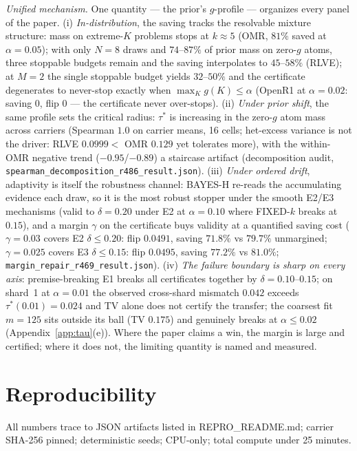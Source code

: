 \documentclass{article}
\theoremstyle{definition}
\theoremstyle{remark}
\begin{document}
\emph{Unified mechanism.} One quantity --- the prior's $g$-profile ---
organizes every panel of the paper. (i) \emph{In-distribution}, the
saving tracks the resolvable mixture structure: mass on extreme-$K$
problems stops at $k\approx5$ (OMR, $81\%$ saved at $\alpha{=}0.05$);
with only $N{=}8$ draws and $74$--$87\%$ of prior mass on zero-$g$
atoms, three stoppable budgets remain and the saving interpolates to
$45$--$58\%$ (RLVE); at $M{=}2$ the single stoppable budget yields
$32$--$50\%$ and the certificate degenerates to never-stop exactly when
$\max_K g(K)\le\alpha$ (OpenR1 at $\alpha{=}0.02$: saving $0$, flip $0$
--- the certificate never over-stops). (ii) \emph{Under prior shift},
the same profile sets the critical radius: $\tau^*$ is increasing in the
zero-$g$ atom mass across carriers (Spearman $1.0$ on carrier means, 16
cells; het-excess variance is not the driver: RLVE $0.0999<$ OMR $0.129$
yet tolerates more), with the within-OMR negative trend
($-0.95$/$-0.89$) a staircase artifact (decomposition audit,
\texttt{spearman\_decomposition\_r486\_result.json}). (iii) \emph{Under
ordered drift}, adaptivity is itself the robustness channel: BAYES-H
re-reads the accumulating evidence each draw, so it is the most robust
stopper under the smooth E2/E3 mechanisms (valid to $\delta{=}0.20$
under E2 at $\alpha{=}0.10$ where FIXED-$k$ breaks at $0.15$), and a
margin $\gamma$ on the certificate buys validity at a quantified saving
cost ($\gamma{=}0.03$ covers E2 $\delta\le0.20$: flip $0.0491$, saving
$71.8\%$ vs $79.7\%$ unmargined; $\gamma{=}0.025$ covers E3
$\delta\le0.15$: flip $0.0495$, saving $77.2\%$ vs $81.0\%$;
\texttt{margin\_repair\_r469\_result.json}). (iv) \emph{The failure
boundary is sharp on every axis}: premise-breaking E1 breaks all
certificates together by $\delta{=}0.10$--$0.15$; on shard~1 at
$\alpha{=}0.01$ the observed cross-shard mismatch $0.042$ exceeds
$\tau^*(0.01){=}0.024$ and TV alone does not certify the transfer; the
coarsest fit $m{=}125$ sits outside its ball (TV $0.175$) and genuinely
breaks at $\alpha\le0.02$ (Appendix~\ref{app:tau}(e)). Where the paper
claims a win, the margin is large and certified; where it does not, the
limiting quantity is named and measured.

\section{Reproducibility}
\label{app:repro}
All numbers trace to JSON artifacts listed in REPRO\_README.md; carrier
SHA-256 pinned; deterministic seeds; CPU-only; total compute under 25 minutes.
\end{document}
